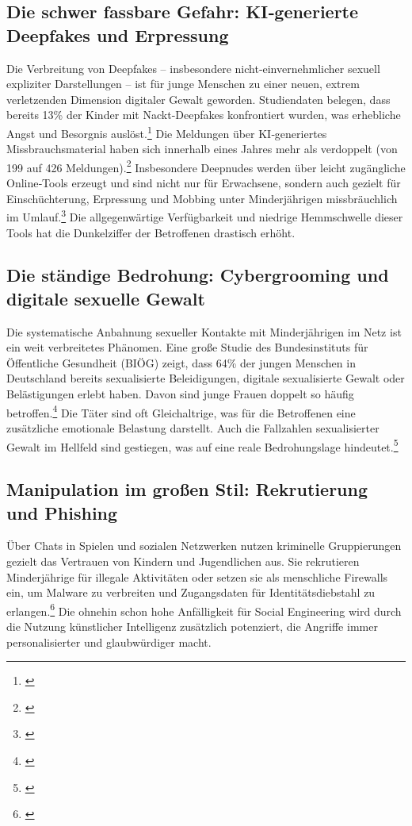 \documentclass[10pt,a4paper]{article}
\begin{document}
	\subsection{Die schwer fassbare Gefahr: KI‑generierte Deepfakes und Erpressung}
	Die Verbreitung von Deepfakes – insbesondere nicht‑einvernehmlicher sexuell expliziter Darstellungen – ist für junge Menschen zu einer neuen, extrem verletzenden Dimension digitaler Gewalt geworden. Studiendaten belegen, dass bereits 13\% der Kinder mit Nackt-Deepfakes konfrontiert wurden, was erhebliche Angst und Besorgnis auslöst.\footnote{\cite{ProtectorKinder}} Die Meldungen über KI‑generiertes Missbrauchsmaterial haben sich innerhalb eines Jahres mehr als verdoppelt (von 199 auf 426 Meldungen).\footnote{\cite{InternetMatters2025}} Insbesondere Deepnudes werden über leicht zugängliche Online‑Tools erzeugt und sind nicht nur für Erwachsene, sondern auch gezielt für Einschüchterung, Erpressung und Mobbing unter Minderjährigen missbräuchlich im Umlauf.\footnote{\cite{InternetMatters2025}} Die allgegenwärtige Verfügbarkeit und niedrige Hemmschwelle dieser Tools hat die Dunkelziffer der Betroffenen drastisch erhöht.
	
	\subsection{Die ständige Bedrohung: Cybergrooming und digitale sexuelle Gewalt}
	Die systematische Anbahnung sexueller Kontakte mit Minderjährigen im Netz ist ein weit verbreitetes Phänomen. Eine große Studie des Bundesinstituts für Öffentliche Gesundheit (BIÖG) zeigt, dass 64\% der jungen Menschen in Deutschland bereits sexualisierte Beleidigungen, digitale sexualisierte Gewalt oder Belästigungen erlebt haben. Davon sind junge Frauen doppelt so häufig betroffen.\footnote{\cite{BIÖG2026}} Die Täter sind oft Gleichaltrige, was für die Betroffenen eine zusätzliche emotionale Belastung darstellt. Auch die Fallzahlen sexualisierter Gewalt im Hellfeld sind gestiegen, was auf eine reale Bedrohungslage hindeutet.\footnote{\cite{BKA2025}}
	
	\subsection{Manipulation im großen Stil: Rekrutierung und Phishing}
	Über Chats in Spielen und sozialen Netzwerken nutzen kriminelle Gruppierungen gezielt das Vertrauen von Kindern und Jugendlichen aus. Sie rekrutieren Minderjährige für illegale Aktivitäten oder setzen sie als menschliche Firewalls ein, um Malware zu verbreiten und Zugangsdaten für Identitätsdiebstahl zu erlangen.\footnote{\cite{ProtectorKinder}} Die ohnehin schon hohe Anfälligkeit für Social Engineering wird durch die Nutzung künstlicher Intelligenz zusätzlich potenziert, die Angriffe immer personalisierter und glaubwürdiger macht.
	
\end{document}

